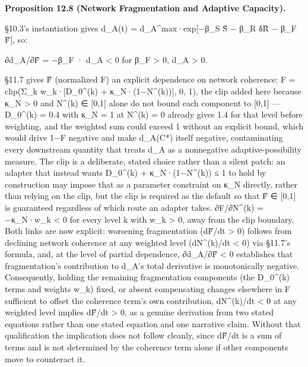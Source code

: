 \documentclass[
]{article}
\begin{document}
\textbf{Proposition 12.8 (Network Fragmentation and Adaptive Capacity).}

§10.3's instantiation gives d\_A(t) = d\_A\^{}max·exp{[}−β\_S S̃ − β\_R
δR̃ − β\_F F̃{]}, so:

∂d\_A/∂F̃ = −β\_F · d\_A \textless{} 0 for β\_F \textgreater{} 0, d\_A
\textgreater{} 0.

§11.7 gives F̃ (normalized F) an explicit dependence on network
coherence: F = clip(Σ\_k w\_k·{[}D\_0\^{}(k) + κ\_N·(1−N\^{}(k)){]}, 0,
1), the clip added here because κ\_N \textgreater{} 0 and N\^{}(k) ∈
{[}0,1{]} alone do not bound each component to {[}0,1{]} --- D\_0\^{}(k)
= 0.4 with κ\_N = 1 at N\^{}(k) = 0 already gives 1.4 for that level
before weighting, and the weighted sum could exceed 1 without an
explicit bound, which would drive 1−F negative and make d\_A(C*) itself
negative, contaminating every downstream quantity that treats d\_A as a
nonnegative adaptive-possibility measure. The clip is a deliberate,
stated choice rather than a silent patch: an adapter that instead wants
D\_0\^{}(k) + κ\_N·(1−N\^{}(k)) ≤ 1 to hold by construction may impose
that as a parameter constraint on κ\_N directly, rather than relying on
the clip, but the clip is required as the default so that F̃ ∈ {[}0,1{]}
is guaranteed regardless of which route an adapter takes. ∂F/∂N\^{}(k) =
−κ\_N·w\_k \textless{} 0 for every level k with w\_k \textgreater{} 0,
away from the clip boundary. Both links are now explicit: worsening
fragmentation (dF̃/dt \textgreater{} 0) follows from declining network
coherence at any weighted level (dN\^{}(k)/dt \textless{} 0) via §11.7's
formula, and, at the level of partial dependence, ∂d\_A/∂F̃ \textless{} 0
establishes that fragmentation's contribution to d\_A's total derivative
is monotonically negative. Consequently, holding the remaining
fragmentation components (the D\_0\^{}(k) terms and weights w\_k) fixed,
or absent compensating changes elsewhere in F sufficient to offset the
coherence term's own contribution, dN\^{}(k)/dt \textless{} 0 at any
weighted level implies dF̃/dt \textgreater{} 0, as a genuine derivation
from two stated equations rather than one stated equation and one
narrative claim. Without that qualification the implication does not
follow cleanly, since dF̃/dt is a sum of terms and is not determined by
the coherence term alone if other components move to counteract it.
\end{document}
